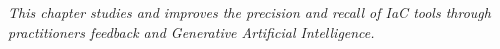 
\label{cap:chapter}

\textit{This chapter studies and improves the precision and recall of IaC tools through practitioners feedback and Generative Artificial Intelligence.}




\cleardoublepage
